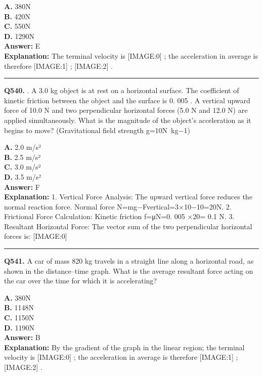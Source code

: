 \documentclass[12pt]{article}
\begin{document}
\textbf{A.} 380N \\
\textbf{B.} 420N \\
\textbf{C.} 550N \\
\textbf{D.} 1290N \\

\textbf{Answer:} E \\
\textbf{Explanation:} The terminal velocity is
[IMAGE:0]
; the acceleration in average is therefore
[IMAGE:1]
;
[IMAGE:2]
.

\hrule
\vspace{1em}


\noindent
\textbf{Q540.} .
A 3.0 kg object is at rest on a horizontal surface. The coefficient of kinetic friction between the object and the surface is 0.
005
. A vertical upward force of 10.0 N and two perpendicular horizontal forces (5.0 N and 12.0 N) are applied simultaneously. What is the magnitude of the object's acceleration as it begins to move? (Gravitational field strength g=10N kg−1)



\textbf{A.} 2.0 m/s² \\
\textbf{B.} 2.5 m/s² \\
\textbf{C.} 3.0 m/s² \\
\textbf{D.} 3.5 m/s² \\

\textbf{Answer:} F \\
\textbf{Explanation:} 1.
Vertical Force Analysis:
The upward vertical force reduces the normal reaction force.
Normal force N=mg−Fvertical​=3×10−10=20N.
2.
Frictional Force Calculation:
Kinetic friction f=μN=0.
005
×20=
0.1
N.
3.
Resultant Horizontal Force:
The vector sum of the two perpendicular horizontal forces is:
[IMAGE:0]

\hrule
\vspace{1em}


\noindent
\textbf{Q541.} A car of mass 820 kg travels in a straight line along a horizontal road, as shown in the distance–time graph.
What is the average resultant force acting on the car over the time for which it is accelerating?



\textbf{A.} 380N \\
\textbf{B.} 1148N \\
\textbf{C.} 1150N \\
\textbf{D.} 1190N \\

\textbf{Answer:} B \\
\textbf{Explanation:} By the gradient of the graph in the linear region; the terminal velocity is
[IMAGE:0]
; the acceleration in average is therefore
[IMAGE:1]
;
[IMAGE:2]
.
\end{document}
